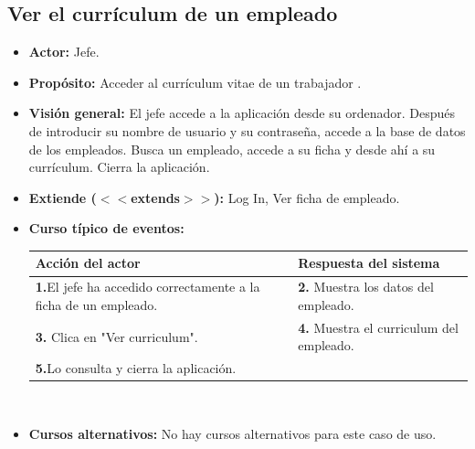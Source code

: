 \documentclass[spanish,a4paper,12pt]{report}	%
\begin{document}

	\subsection{Ver el currículum de un empleado}		
			\begin{itemize}
			\item \textbf{Actor:} Jefe.
			\item \textbf{Propósito: } Acceder al currículum vitae de un trabajador  .
			\item \textbf{Visión general:} El jefe accede a la aplicación desde su ordenador. Después de introducir su nombre de usuario y su contraseña, accede a la base de datos de los empleados. Busca un empleado, accede a su ficha y desde ahí a su currículum. Cierra la aplicación. 
			\item \textbf{Extiende ($<<$extends$>>$):} Log In, Ver ficha de empleado.
	\newpage
			\item \textbf{Curso típico de eventos:} 	\\
				\begin{tabular}{|p{6cm}||p{6cm}|}
				\hline
				\textbf{Acción del actor} & \textbf{Respuesta del sistema} \\ \hline \hline
				\textbf{1.}El jefe ha accedido correctamente a la ficha de un empleado. & \textbf{2.} Muestra los datos del empleado.\\ \hline
				\textbf{3.} Clica en "Ver curriculum".	& \textbf{4.} Muestra el curriculum del empleado. \\ \hline
				\textbf{5.}Lo consulta y cierra la aplicación. & \textbf{} \\ \hline
			\end{tabular}
			\\
			\item \textbf{Cursos alternativos:} No hay cursos alternativos para este caso de uso.
		\end{itemize}%



\end{document}
